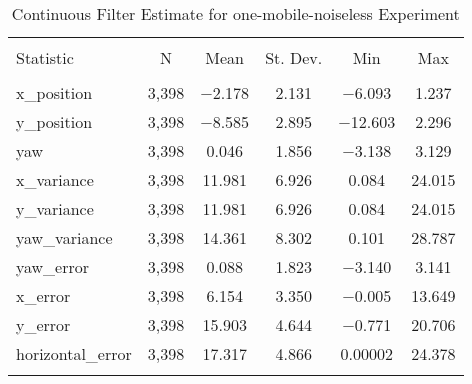 
\begin{table}[h] \centering 
  \caption{Continuous Filter Estimate for one-mobile-noiseless Experiment} 
  \label{tab:one_mobile_noiseless_continuous_summary} 
\begin{tabular}{@{\extracolsep{5pt}}lccccc} 
\\[-1.8ex]\hline 
\hline \\[-1.8ex] 
Statistic & \multicolumn{1}{c}{N} & \multicolumn{1}{c}{Mean} & \multicolumn{1}{c}{St. Dev.} & \multicolumn{1}{c}{Min} & \multicolumn{1}{c}{Max} \\ 
\hline \\[-1.8ex] 
x\_position & 3,398 & $-$2.178 & 2.131 & $-$6.093 & 1.237 \\ 
y\_position & 3,398 & $-$8.585 & 2.895 & $-$12.603 & 2.296 \\ 
yaw & 3,398 & 0.046 & 1.856 & $-$3.138 & 3.129 \\ 
x\_variance & 3,398 & 11.981 & 6.926 & 0.084 & 24.015 \\ 
y\_variance & 3,398 & 11.981 & 6.926 & 0.084 & 24.015 \\ 
yaw\_variance & 3,398 & 14.361 & 8.302 & 0.101 & 28.787 \\ 
yaw\_error & 3,398 & 0.088 & 1.823 & $-$3.140 & 3.141 \\ 
x\_error & 3,398 & 6.154 & 3.350 & $-$0.005 & 13.649 \\ 
y\_error & 3,398 & 15.903 & 4.644 & $-$0.771 & 20.706 \\ 
horizontal\_error & 3,398 & 17.317 & 4.866 & 0.00002 & 24.378 \\ 
\hline \\[-1.8ex] 
\end{tabular} 
\end{table} 
